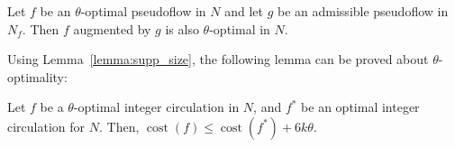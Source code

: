 \documentclass[a4paper,UKenglish]{socg-lipics-v2018}
\def\arcto{\mathord\shortrightarrow}
\def\arc#1#2{#1\arcto#2}
\def\cost{\operatorname{cost}}
\def\supp{\operatorname{supp}}
\theoremstyle{plain}
\numberwithin{figure}{section}
\begin{document}
\begin{lemma}
\label{lemma:eps_opt_preserve}
Let $f$ be an $\theta$-optimal pseudoflow in $N$ and let $g$ be an admissible
pseudoflow in $N_f$.
Then $f$ augmented by $g$ is also $\theta$-optimal in $N$.
\end{lemma}

%

Using Lemma~\ref{lemma:supp_size}, the following lemma can be proved about
$\theta$-optimality:

\begin{lemma}
\label{lemma:goldberg_cost_add}
Let $f$ be a $\theta$-optimal integer circulation in $N$,
and $f^*$ be an optimal integer circulation for $N$.
Then, $\cost(f) \leq \cost(f^*) + 6k\theta$.
\end{lemma}

%
%
\end{document}
